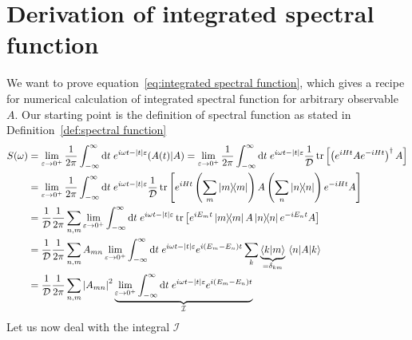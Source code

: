 \chapter{Derivation of integrated spectral function\label{app:spectral}}
\thispagestyle{chapterBeginStyle}
We want to prove equation~\eqref{eq:integrated spectral function}, which gives
a recipe for numerical calculation of integrated spectral function for arbitrary observable \(A\).
Our starting point is the definition of spectral function as stated in Definition~\ref{def:spectral function}
\begin{align}
        S(\omega) &=  \lim _{\varepsilon \to 0^+} \frac{1}{2 \pi} \int_{-\infty}^{\infty} \mathrm{d} t 
        \; e^{i \omega t-|t| \varepsilon}\hs{A(t)}{A} = \lim _{\varepsilon \to 0^+} \frac{1}{2 \pi}
        \int_{-\infty}^{\infty} \mathrm{d} t \; e^{i \omega t-|t| \varepsilon} \frac{1}{\dimension}
        \tr\left[\left(e^{iHt}Ae^{-iHt}\right)^{\dagger}A\right] \nonumber\\
        &=\lim _{\varepsilon \to 0^+} \frac{1}{2 \pi}
        \int_{-\infty}^{\infty} \mathrm{d} t \; e^{i \omega t-|t| \varepsilon} \frac{1}{\dimension}
        \tr\left[e^{iHt}\left(\sum_{m} \ketbra{m}{m}\right) 
        A\left(\sum_{n} \ketbra{n}{n}\right)e^{-iHt}A\right] \nonumber\\
        &= \frac{1}{\dimension} \frac{1}{2 \pi}\sum_{n,m} \lim _{\varepsilon \to 0^+} 
        \int_{-\infty}^{\infty} \mathrm{d} t \; e^{i \omega t-|t| \varepsilon}
        \tr\left[e^{i E_m t}\ketbra{m}{m} A\ketbra{n}{n}e^{-i E_n t}A\right] \nonumber\\
        &= \frac{1}{\dimension} \frac{1}{2 \pi}\sum_{n,m} A_{mn}  \lim _{\varepsilon \to 0^+} 
        \int_{-\infty}^{\infty} \mathrm{d} t \; e^{i \omega t-|t| \varepsilon}e^{i (E_m-E_n) t}
        \sum_{k} \underbrace{\braket{k}{m}}_{=\delta_{km}} \matrixel{n}{A}{k} \nonumber\\
        &= \frac{1}{\dimension} \frac{1}{2 \pi}\sum_{n,m} \abs{A_{mn}}^2  \underbrace{\lim _{\varepsilon 
        \to 0^+} \int_{-\infty}^{\infty} \mathrm{d} t \; e^{i \omega t-|t| 
        \varepsilon}e^{i (E_m-E_n) t}}_{\mathcal{I}}\label{eq:spectral function simplified}
\end{align}
Let us now deal with the integral \(\mathcal{I}\)
